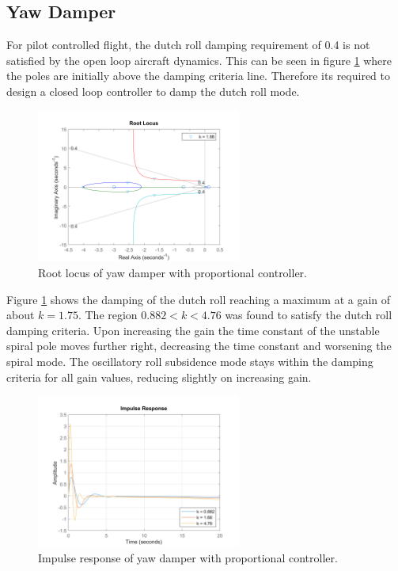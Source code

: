\documentclass{article}
\begin{document}
\subsection{Yaw Damper}

For pilot controlled flight, the dutch roll damping requirement of 0.4 is not satisfied by the open loop aircraft dynamics.
This can be seen in figure \ref{fig:yaw_damper_rlocus} where the poles are initially above the damping criteria line.
Therefore its required to design a closed loop controller to damp the dutch roll mode.

\begin{figure}[H]
    \centering
    \includegraphics[width=0.6\textwidth]{figures/yaw_damper_rlocus.png}
    \caption{Root locus of yaw damper with proportional controller.}
    \label{fig:yaw_damper_rlocus}
\end{figure}

Figure \ref{fig:yaw_damper_rlocus} shows the damping of the dutch roll reaching a maximum at a gain of about $k=1.75$.
The region $ 0.882 < k < 4.76$ was found to satisfy the dutch roll damping criteria.
Upon increasing the gain the time constant of the unstable spiral pole moves further right, decreasing the time constant and worsening the spiral mode.
The oscillatory roll subsidence mode stays within the damping criteria for all gain values, reducing slightly on increasing gain.

\begin{figure}[H]
    \centering
    \includegraphics[width=0.6\textwidth]{figures/yaw_damper_impulse.png}
    \caption{Impulse response of yaw damper with proportional controller.}
    \label{fig:yaw_damper_impulse}
\end{figure}
\end{document}
